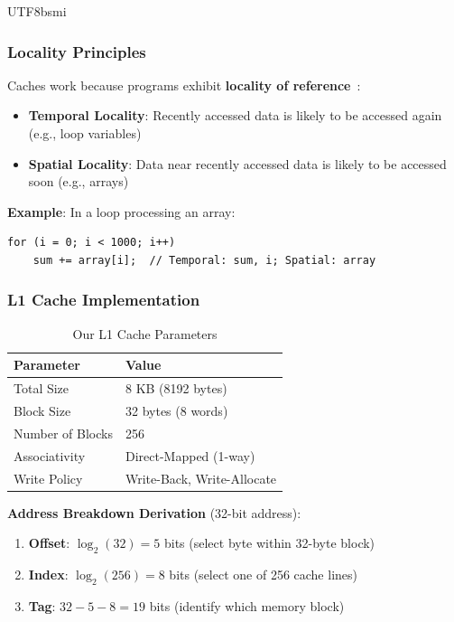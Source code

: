 \documentclass[journal,twoside]{IEEEtran}
\begin{document}
\begin{CJK}{UTF8}{bsmi}
\subsubsection{Locality Principles}
Caches work because programs exhibit \textbf{locality of reference}~\cite{hennessy2017computer}:
\begin{itemize}
    \item \textbf{Temporal Locality}: Recently accessed data is likely to be accessed again (e.g., loop variables)
    \item \textbf{Spatial Locality}: Data near recently accessed data is likely to be accessed soon (e.g., arrays)
\end{itemize}

\textbf{Example}: In a loop processing an array:
\begin{lstlisting}
for (i = 0; i < 1000; i++)
    sum += array[i];  // Temporal: sum, i; Spatial: array
\end{lstlisting}

\subsubsection{L1 Cache Implementation}
\begin{table}[!t]
\centering
\caption{Our L1 Cache Parameters}
\footnotesize
\begin{tabular}{@{}ll@{}}
\toprule
\textbf{Parameter} & \textbf{Value} \\
\midrule
Total Size & 8 KB (8192 bytes) \\
Block Size & 32 bytes (8 words) \\
Number of Blocks & 256 \\
Associativity & Direct-Mapped (1-way) \\
Write Policy & Write-Back, Write-Allocate \\
\bottomrule
\end{tabular}
\end{table}

\textbf{Address Breakdown Derivation} (32-bit address):
\begin{enumerate}
    \item \textbf{Offset}: $\log_2(32) = 5$ bits (select byte within 32-byte block)
    \item \textbf{Index}: $\log_2(256) = 8$ bits (select one of 256 cache lines)
    \item \textbf{Tag}: $32 - 5 - 8 = 19$ bits (identify which memory block)
\end{enumerate}


\end{CJK}
\end{document}
